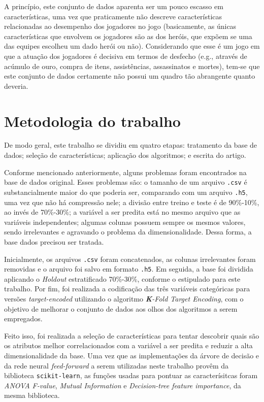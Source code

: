\documentclass[12pt]{article}
\begin{document}
A princípio, este conjunto de dados aparenta ser um pouco escasso em características, uma vez que praticamente não descreve características relacionadas ao desempenho dos jogadores no jogo (basicamente, as únicas características que envolvem os jogadores são as dos heróis, que expõem se uma das equipes escolheu um dado herói ou não). Considerando que esse é um jogo em que a atuação dos jogadores é decisiva em termos de desfecho (e.g., através de acúmulo de ouro, compra de itens, assistências, assassinatos e mortes), tem-se que este conjunto de dados certamente não possui um quadro tão abrangente quanto deveria.

\section{Metodologia do trabalho}\label{sec:metodologia}
De modo geral, este trabalho se dividiu em quatro etapas: tratamento da base de dados; seleção de características; aplicação dos algoritmos; e escrita do artigo.

Conforme mencionado anteriormente, alguns problemas foram encontrados na base de dados original. Esses problemas são: o tamanho de um arquivo \texttt{.csv} é substancialmente maior do que poderia ser, comparando com um arquivo \texttt{.h5}, uma vez que não há compressão nele; a divisão entre treino e teste é de 90\%-10\%, ao invés de 70\%-30\%; a variável a ser predita está no mesmo arquivo que as variáveis independentes; algumas colunas possuem sempre os mesmos valores, sendo irrelevantes e agravando o problema da dimensionalidade. Dessa forma, a base dados precisou ser tratada.

Inicialmente, os arquivos \texttt{.csv} foram concatenados, as colunas irrelevantes foram removidas e o arquivo foi salvo em formato \texttt{.h5}. Em seguida, a base foi dividida aplicando o \textit{Holdout} estratificado 70\%-30\%, conforme o estipulado para este trabalho. Por fim, foi realizada a codificação das três variáveis categóricas para versões \textit{target-encoded} utilizando o algoritmo \textit{\textbf{K}-Fold Target Encoding}, com o objetivo de melhorar o conjunto de dados aos olhos dos algoritmos a serem empregados.

Feito isso, foi realizada a seleção de características para tentar descobrir quais são os atributos melhor correlacionados com a variável a ser predita e reduzir a alta dimensionalidade da base. Uma vez que as implementações da árvore de decisão e da rede neural \textit{feed-forward} a serem utilizadas neste trabalho provêm da biblioteca \texttt{scikit-learn}, as funções usadas para pontuar as caracterísitcas foram \textit{ANOVA F-value}, \textit{Mutual Information} e \textit{Decision-tree feature importance}, da mesma biblioteca.
\end{document}
